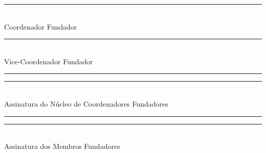 \documentclass[
  12pt,          %
  a4paper,       %
  oneside,       %
  brazil         %
]{article}
\begin{document}
\vspace{2cm}
\begin{center}
	\rule{0.45\textwidth}{0.4pt}\\[0.3em]
	\small\color{gulecdGray}
	Coordenador Fundador
\end{center}

\vspace{2cm}
\begin{center}
	\rule{0.45\textwidth}{0.4pt}\\[0.3em]
	\small\color{gulecdGray}
	Vice-Coordenador Fundador
\end{center}

\vspace{4cm}
\begin{center}
	\rule{0.45\textwidth}{0.4pt}\hfill\rule{0.45\textwidth}{0.4pt}\\[0.3em]
	\small\color{gulecdGray}
	Assinatura do Núcleo de Coordenadores Fundadores
\end{center}

\pagebreak

\vspace{1cm}
\begin{center}
	\rule{0.45\textwidth}{0.4pt}\hfill\rule{0.45\textwidth}{0.4pt}\\[0.3em]
	\small\color{gulecdGray}
	Assinatura dos Membros Fundadores
\end{center}

\end{document}
